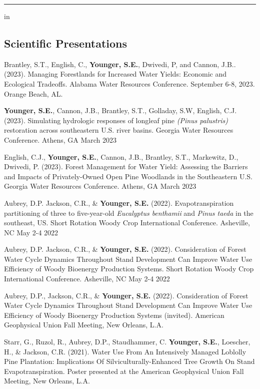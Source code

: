 \documentclass[10pt,letterpaper]{article}
\begin{document}
	
	\hrule
	\vspace{-0.4em}
	 in
	
	\subsection*{Scientific Presentations}
	
	\begin{hangparas}{.25in}{1}
		
		Brantley, S.T., English, C., \textbf{Younger, S.E.}, Dwivedi, P, and Cannon, J.B.. (2023). Managing Forestlands for Increased Water Yields: Economic and Ecological Tradeoffs. Alabama Water Resources Conference. September 6-8, 2023. Orange Beach, AL.
	
		\textbf{Younger, S.E.}, Cannon, J.B., Brantley, S.T., Golladay, S.W, English, C.J. (2023). Simulating hydrologic responses of longleaf pine \textit{(Pinus palustris)} restoration across southeastern U.S. river basins. Georgia Water Resources Conference. Athens, GA March 2023
		
		English, C.J., \textbf{Younger, S.E.}, Cannon, J.B., Brantley, S.T., Markewitz, D., Dwivedi, P. (2023). Forest Management for Water Yield: Assessing the Barriers and Impacts of Privately-Owned Open Pine Woodlands in the Southeastern U.S. Georgia Water Resources Conference. Athens, GA March 2023
		
		Aubrey, D.P. Jackson, C.R., \& \textbf{Younger, S.E.} (2022). Evapotranspiration partitioning of three to five-year-old \textit{Eucalyptus benthamii} and \textit{Pinus taeda} in the southeast, US. Short Rotation Woody Crop International Conference. Asheville, NC May 2-4 2022
		
		Aubrey, D.P. Jackson, C.R., \& \textbf{Younger, S.E.} (2022). Consideration of Forest Water Cycle Dynamics Throughout Stand Development Can Improve Water Use Efficiency of Woody Bioenergy Production Systems. Short Rotation Woody Crop International Conference. Asheville, NC May 2-4 2022
		
		Aubrey, D.P., Jackson, C.R., \& \textbf{Younger, S.E.} (2022). Consideration of Forest Water Cycle Dynamics Throughout Stand Development Can Improve Water Use Efficiency of Woody Bioenergy Production Systems (invited). American Geophysical Union Fall Meeting, New Orleans, L.A.
		
		Starr, G., Ruzol, R., Aubrey, D.P., Staudhammer, C. \textbf{Younger, S.E.}, Loescher, H., \& Jackson, C.R. (2021). Water Use From An Intensively Managed Loblolly Pine Plantation: Implications Of Silviculturally-Enhanced Tree Growth On Stand Evapotranspiration. Poster presented at the American Geophysical Union Fall Meeting, New Orleans, L.A.
		

\end{hangparas}
\end{document}
